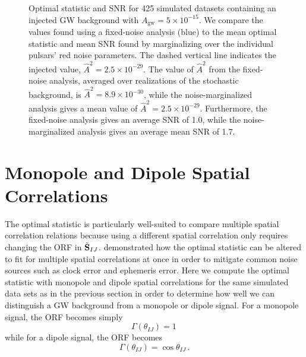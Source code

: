 \documentclass[twocolumn,aps,prd,superscriptaddress]{revtex4-1}
\newcommand{\Agw}{\ensuremath{A_\mathrm{gw}}}
\begin{document}
\begin{figure}[ht]
	\caption{Optimal statistic and SNR for 425 simulated datasets 
			containing an injected GW background with $\Agw = 5\times10^{-15}$. 
			We compare the values found using a fixed-noise analysis (blue) to the 
			mean optimal statistic and mean SNR found by marginalizing over 
			the individual pulsars' red noise parameters. The dashed vertical line 
			indicates the injected value, $\hat{A}^2 = 2.5 \times 10^{-29}$. 
			The value of $\hat{A}^2$ from the fixed-noise analysis, 
			averaged over realizations of the stochastic background, is $\hat{A}^2 = 8.9 \times 10^{-30}$, 
			while the noise-marginalized analysis gives a mean value of $\hat{A}^2 = 2.5 \times 10^{-29}$. 
			Furthermore, the fixed-noise analysis gives an average SNR of 1.0, while the 
			noise-marginalized analysis gives an average mean SNR of 1.7.}
	\label{fig:os_datasetstats}
\end{figure}


\section{Monopole and Dipole Spatial Correlations}
\label{sec:spatial}

The optimal statistic is particularly well-suited to compare multiple spatial correlation relations 
because using a different spatial correlation only requires changing the ORF 
in $\tilde{{\bf{S}}}_{IJ}$. 
\citet{thk+2016} demonstrated how the optimal statistic can be altered to fit for 
multiple spatial correlations at once in order to mitigate common noise sources such as 
clock error and ephemeris error. 
Here we compute the optimal statistic with monopole and dipole spatial correlations 
for the same simulated data sets as in the previous section in order to determine 
how well we can distinguish a GW background from a monopole or dipole signal. 
For a monopole signal, the ORF becomes simply
\[ \Gamma(\theta_{IJ}) = 1 \,\]
while for a dipole signal, the ORF becomes
\[ \Gamma(\theta_{IJ}) = \cos\theta_{IJ} \,. \]
\end{document}
